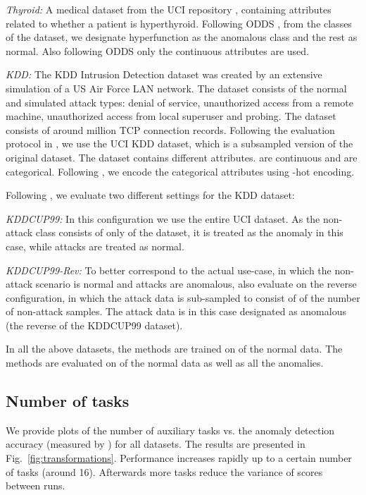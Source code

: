 \documentclass{article} \usepackage{iclr2020_conference,times}
\begin{document}
\textit{Thyroid:} A medical dataset from the UCI repository \citep{asuncion2007uci}, containing attributes related to whether a patient is hyperthyroid. Following ODDS \citep{Rayana:2016}, from the  classes of the dataset, we designate hyperfunction as the anomalous class and the rest as normal. Also following ODDS only the  continuous attributes are used.

\textit{KDD:} The KDD Intrusion Detection dataset was created by an extensive simulation of a US Air Force LAN network. The dataset consists of the normal and  simulated attack types: denial of service, unauthorized access from a remote machine, unauthorized access from local superuser and probing. The dataset consists of around  million TCP connection records. Following the evaluation protocol in \cite{zong2018deep}, we use the UCI KDD  dataset, which is a subsampled version of the original dataset. The dataset contains  different attributes.  are continuous and  are categorical. Following \cite{zong2018deep}, we encode the categorical attributes using -hot encoding.

Following \cite{zong2018deep}, we evaluate two different settings for the KDD dataset:

\textit{KDDCUP99:} In this configuration we use the entire UCI  dataset. As the non-attack class consists of only  of the dataset, it is treated as the anomaly in this case, while attacks are treated as normal.

\textit{KDDCUP99-Rev:} To better correspond to the actual use-case, in which the non-attack scenario is normal and attacks are anomalous, \cite{zong2018deep} also evaluate on the reverse configuration, in which the attack data is sub-sampled to consist of  of the number of non-attack samples. The attack data is in this case designated as anomalous (the reverse of the KDDCUP99 dataset).

In all the above datasets, the methods are trained on  of the normal data. The methods are evaluated on  of the normal data as well as all the anomalies.

\subsection{Number of tasks}
\label{app:tasks}

We provide plots of the number of auxiliary tasks vs. the anomaly detection accuracy (measured by ) for all datasets. The results are presented in Fig.~\ref{fig:transformations}. Performance increases rapidly up to a certain number of tasks (around 16). Afterwards more tasks reduce the variance of  scores between runs. 
\end{document}
